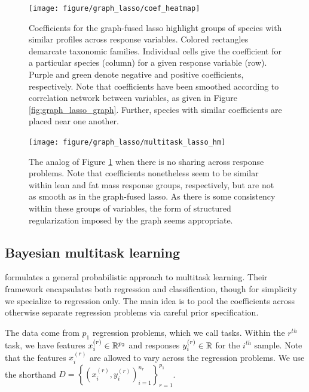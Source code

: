 \documentclass[14pt]{extarticle}
\begin{document}
\begin{figure}
  \centering
  \texttt{[image: figure/graph\_lasso/coef\_heatmap]}
  \caption{Coefficients for the graph-fused lasso highlight groups of species
    with similar profiles across response variables. Colored rectangles
    demarcate taxonomic families. Individual cells give the coefficient for a
    particular species (column) for a given response variable (row). Purple and
    green denote negative and positive coefficients, respectively. Note that
    coefficients have been smoothed according to correlation network between
    variables, as given in Figure \ref{fig:graph_lasso_graph}. Further, species
    with similar coefficients are placed near one
    another. \label{fig:graph_lasso_coef_heatmap} }
\end{figure}

\begin{figure}
  \centering
  \texttt{[image: figure/graph\_lasso/multitask\_lasso\_hm]}
  \caption{The analog of Figure \ref{fig:graph_lasso_coef_heatmap} when there is
    no sharing across response problems. Note that coefficients nonetheless seem
    to be similar within lean and fat mass response groups, respectively, but
    are not as smooth as in the graph-fused lasso. As there is some consistency
    within these groups of variables, the form of structured regularization
    imposed by the graph seems
    appropriate. \label{fig:graph_lasso_multitask_lasso_hm} }
\end{figure}

\subsection{Bayesian multitask learning}
\label{subsec:bayesian_multitask}

\cite{zhang2005learning} formulates a general probabilistic approach to
multitask learning. Their framework encapsulates both regression and
classification, though for simplicity we specialize to regression only. The main
idea is to pool the coefficients across otherwise separate regression problems
via careful prior specification.

The data come from $p_{1}$ regression problems, which we call tasks. Within the
$r^{th}$ task, we have features $x_{i}^{(r)} \in \mathbb{R}^{p_{2}}$ and responses
$y_{i}^{(r)} \in \mathbb{R}$ for the $i^{th}$ sample. Note that the features
$x_{i}^{(r)}$ are allowed to vary across the regression problems. We use the
shorthand $D = \left\{\left(x_{i}^{(r)}, y_i^{(r)}\right)_{i =
  1}^{n_{r}}\right\}_{r = 1}^{p_{1}}$.
\end{document}
